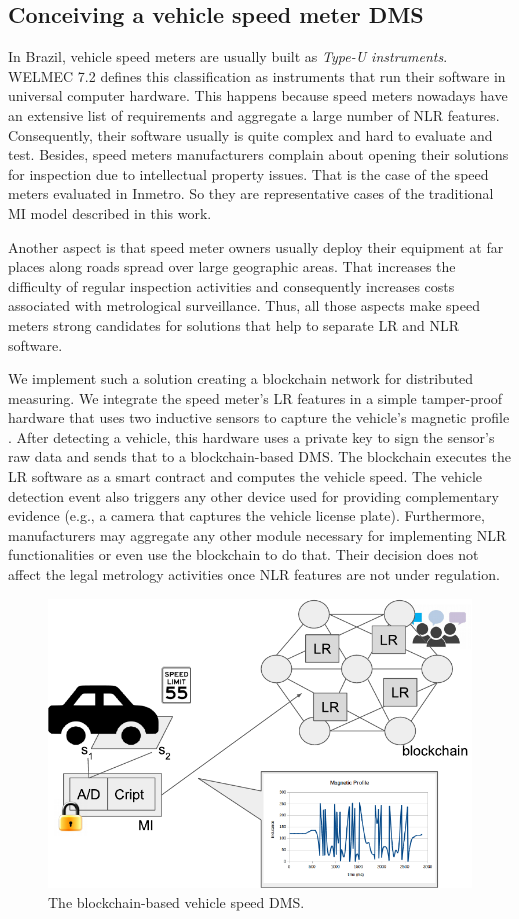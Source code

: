 \documentclass[journal]{IEEEtran}
\begin{document}
\subsection{Conceiving a vehicle speed meter DMS}
In Brazil, vehicle speed meters are usually built as \emph{Type-U instruments}.
WELMEC 7.2 \cite{EuropeanCooperationinLegalMetrologyWELMEC2015} defines this classification as instruments that run their software in universal computer hardware.
This happens because speed meters nowadays have an extensive list of requirements and aggregate a large number of NLR features.
Consequently, their software usually is quite complex and hard to evaluate and test.
Besides, speed meters manufacturers complain about opening their solutions for inspection due to intellectual property issues.
That is the case of the speed meters evaluated in Inmetro.
So they are representative cases of the traditional MI model described in this work.

Another aspect is that speed meter owners usually deploy their equipment at far places along roads spread over large geographic areas.
That increases the difficulty of regular inspection activities and consequently increases costs associated with metrological surveillance.
Thus, all those aspects make speed meters strong candidates for solutions that help to separate LR and NLR software.

We implement such a solution creating a blockchain network for distributed measuring.
We integrate the speed meter's LR features in a simple tamper-proof hardware that uses two inductive sensors to capture the vehicle's magnetic profile \cite{S2011}.
After detecting a vehicle, this hardware uses a private key to sign the sensor's raw data and sends that to a blockchain-based DMS.
The blockchain executes the LR software as a smart contract and computes the vehicle speed.
The vehicle detection event also triggers any other device used for providing complementary evidence (e.g., a camera that captures the vehicle license plate).
Furthermore, manufacturers may aggregate any other module necessary for implementing NLR functionalities or even use the blockchain to do that.
Their decision does not affect the legal metrology activities once NLR features are not under regulation.

\begin{figure}[!t]
\centering
\includegraphics[width=.45\textwidth]{speedmeter} %
\caption{The blockchain-based vehicle speed DMS.}
\label{f:speedmeter}
\end{figure}
\end{document}
